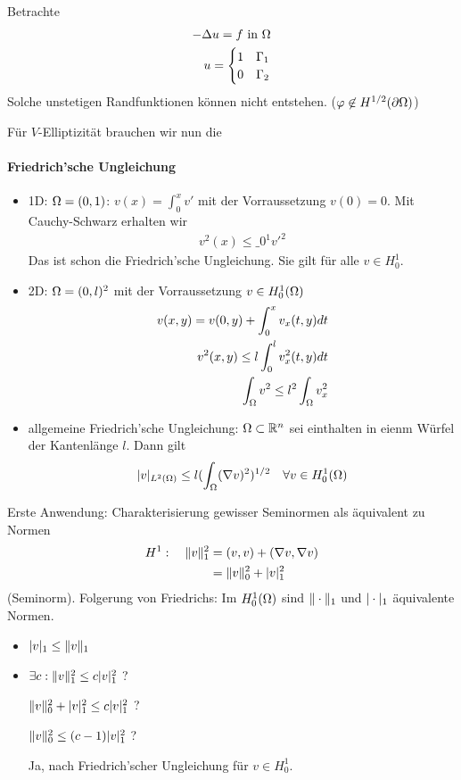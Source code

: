 Betrachte 
\begin{align*}
  -\Delta u = f \text{ in } \Omega\\
u =
\begin{cases}
  1 & \Gamma_1\\
0 & \Gamma_2
\end{cases}
\end{align*}
Solche unstetigen Randfunktionen können nicht entstehen. ($\varphi \not \in H^{1/2}(\partial \Omega)$)

Für $V$-Elliptizität brauchen wir nun die \paragraph{Friedrich'sche Ungleichung}
\begin{itemize}
\item 1D: $\Omega = (0,1)$: $v(x) = \int_0^x v'$ mit der Vorraussetzung $v(0) = 0$. Mit Cauchy-Schwarz erhalten wir
\begin{align*}
  v^2(x) \leq \_0^1 v'^2
\end{align*}
Das ist schon die Friedrich'sche Ungleichung. Sie gilt für alle $v \in H^1_0$.
\item 2D: $\Omega = (0, l)^2$ mit der Vorraussetzung $v \in H_0^1 (\Omega)$
  \begin{align*}
    v (x, y) = v(0,y) + \int_0^x v_x(t, y) dt\\
    v^2 (x, y) \leq l \int_0^l v^2_x(t, y) dt\\
   \int_\Omega v^2 \leq l^2 \int_\Omega v^2_x
  \end{align*}
\item allgemeine Friedrich'sche Ungleichung: $\Omega \subset \mathbb{R}^n$ sei einthalten in eienm Würfel der Kantenlänge $l$. Dann gilt
  \begin{align*}
    |v| _{L^2 (\Omega) }  \leq l(\int_\Omega(\nabla v)^2)^{1/2} \quad \forall v \in H^1_0 (\Omega)
  \end{align*}
\end{itemize}

Erste Anwendung: Charakterisierung gewisser Seminormen als äquivalent zu Normen
\begin{align*}
H^1: \quad \|v\| _1^2 &= (v,v) + (\nabla v, \nabla v)\\
 &= \|v\|_0^2 + |v|_1^2
\end{align*}
(Seminorm). Folgerung von Friedrichs: Im $H_0^1 (\Omega)$ sind $\|\cdot\| _1$ und $|\cdot| _1$ äquivalente Normen.

\begin{itemize}
\item $|v| _1 \leq \|v\|_1$
\item $\exists c : \|v\|_1^2 \leq c |v| _1^2$ ?

$\|v\|_0^2 + |v|_1^2  \leq c |v| _1^2$ ?

$\|v\|_0^2 \leq (c-1) |v| _1^2$ ?

Ja, nach Friedrich'scher Ungleichung für $v \in H^1_0$.
\end{itemize}

